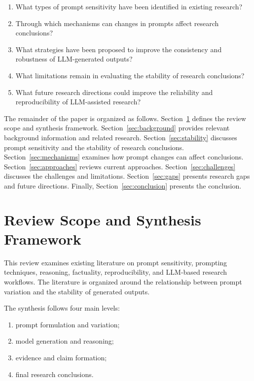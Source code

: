 \documentclass[acmsmall,screen,review]{acmart}
\begin{document}
\begin{enumerate}
\item What types of prompt sensitivity have been identified in existing research?
\item Through which mechanisms can changes in prompts affect research conclusions?
\item What strategies have been proposed to improve the consistency and robustness of LLM-generated outputs?
\item What limitations remain in evaluating the stability of research conclusions?
\item What future research directions could improve the reliability and reproducibility of LLM-assisted research?
\end{enumerate}

The remainder of the paper is organized as follows. Section~\ref{sec:framework} defines the review scope and synthesis framework. Section~\ref{sec:background} provides relevant background information and related research. Section~\ref{sec:stability} discusses prompt sensitivity and the stability of research conclusions. Section~\ref{sec:mechanisms} examines how prompt changes can affect conclusions. Section~\ref{sec:approaches} reviews current approaches. Section~\ref{sec:challenges} discusses the challenges and limitations. Section~\ref{sec:gaps} presents research gaps and future directions. Finally, Section~\ref{sec:conclusion} presents the conclusion.

\section{Review Scope and Synthesis Framework}
\label{sec:framework}

This review examines existing literature on prompt sensitivity, prompting techniques, reasoning, factuality, reproducibility, and LLM-based research workflows. The literature is organized around the relationship between prompt variation and the stability of generated outputs.

The synthesis follows four main levels:

\begin{enumerate}
\item prompt formulation and variation;
\item model generation and reasoning;
\item evidence and claim formation;
\item final research conclusions.
\end{enumerate}
\end{document}
